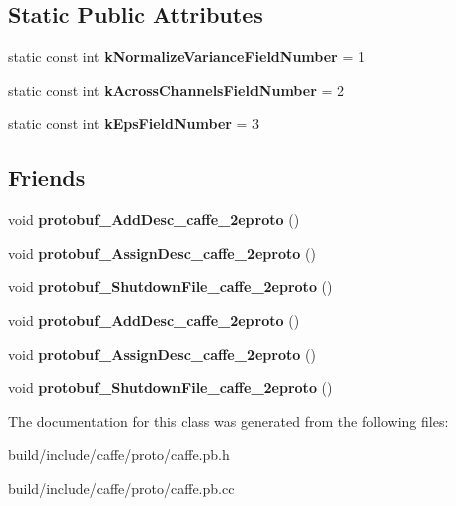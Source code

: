 \subsection*{Static Public Attributes}
\begin{DoxyCompactItemize}
\item 
\mbox{\label{classcaffe_1_1_m_v_n_parameter_a1b3bf9268f130aa60cfd78a173043cd0}} 
static const int {\bfseries k\+Normalize\+Variance\+Field\+Number} = 1
\item 
\mbox{\label{classcaffe_1_1_m_v_n_parameter_aefb3dfcb2bd4543c41e9fc6eaafcc68e}} 
static const int {\bfseries k\+Across\+Channels\+Field\+Number} = 2
\item 
\mbox{\label{classcaffe_1_1_m_v_n_parameter_a35970a4f1633910242c5352a84a80240}} 
static const int {\bfseries k\+Eps\+Field\+Number} = 3
\end{DoxyCompactItemize}
\subsection*{Friends}
\begin{DoxyCompactItemize}
\item 
\mbox{\label{classcaffe_1_1_m_v_n_parameter_a2670a9c8ffd0e5105cf7522cd6f8613d}} 
void {\bfseries protobuf\+\_\+\+Add\+Desc\+\_\+caffe\+\_\+2eproto} ()
\item 
\mbox{\label{classcaffe_1_1_m_v_n_parameter_a7f145bddbdde78003d27e42c7e003d23}} 
void {\bfseries protobuf\+\_\+\+Assign\+Desc\+\_\+caffe\+\_\+2eproto} ()
\item 
\mbox{\label{classcaffe_1_1_m_v_n_parameter_a026784a8e4e76f1b4daf9d033d2ece83}} 
void {\bfseries protobuf\+\_\+\+Shutdown\+File\+\_\+caffe\+\_\+2eproto} ()
\item 
\mbox{\label{classcaffe_1_1_m_v_n_parameter_a2670a9c8ffd0e5105cf7522cd6f8613d}} 
void {\bfseries protobuf\+\_\+\+Add\+Desc\+\_\+caffe\+\_\+2eproto} ()
\item 
\mbox{\label{classcaffe_1_1_m_v_n_parameter_a7f145bddbdde78003d27e42c7e003d23}} 
void {\bfseries protobuf\+\_\+\+Assign\+Desc\+\_\+caffe\+\_\+2eproto} ()
\item 
\mbox{\label{classcaffe_1_1_m_v_n_parameter_a026784a8e4e76f1b4daf9d033d2ece83}} 
void {\bfseries protobuf\+\_\+\+Shutdown\+File\+\_\+caffe\+\_\+2eproto} ()
\end{DoxyCompactItemize}


The documentation for this class was generated from the following files\+:\begin{DoxyCompactItemize}
\item 
build/include/caffe/proto/caffe.\+pb.\+h\item 
build/include/caffe/proto/caffe.\+pb.\+cc\end{DoxyCompactItemize}
